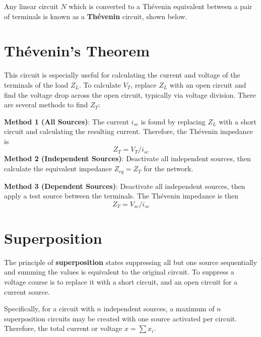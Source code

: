\documentclass{tufte-book}
\begin{document}
\bigskip
Any linear circuit $N$ which is converted to a Thévenin equivalent between a pair of terminals is known as a \textbf{Thévenin} circuit, shown below.

\section{Thévenin's Theorem}

This circuit is especially useful for calculating the current and voltage of the terminals of the load $Z_L$. To calculate $V_T$, replace $Z_L$ with an open circuit and find the voltage drop across the open circuit, typically via voltage division. There are several methods to find $Z_T$:

\bigskip
\textbf{Method 1 (All Sources)}: The current $i_{sc}$ is found by replacing $Z_L$ with a short circuit and calculating the resulting current. Therefore, the Thévenin impedance is
\begin{equation}
 Z_T = V_T/i_{sc}
\end{equation}
\textbf{Method 2 (Independent Sources)}:  Deactivate all independent sources, then calculate the equivalent impedance $Z_{eq}=Z_T$ for the network.

\bigskip
\textbf{Method 3 (Dependent Sources)}: Deactivate all independent sources, then apply a test source between the terminals. The Thévenin impedance is then \begin{equation}
 Z_T = V_{sc}/i_{sc}
\end{equation}

\section{Superposition}

The principle of \textbf{superposition} states suppressing all but one source sequentially and summing the values is equivalent to the original circuit. To suppress a voltage course is to replace it with a short circuit, and an open circuit for a current source.

\bigskip
Specifically, for a circuit with $n$ independent sources, a maximum of $n$ superposition circuits may be created with one source activated per circuit. Therefore, the total current or voltage $x = \sum x_i$.
\end{document}
